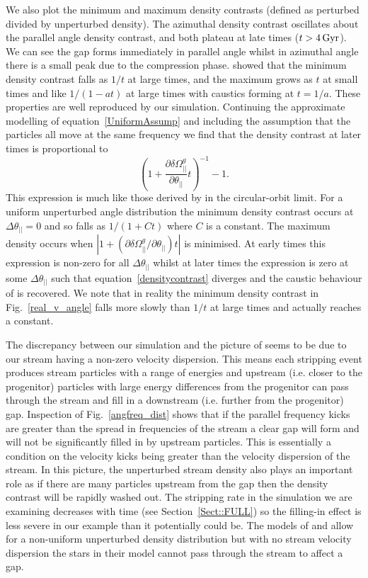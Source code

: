 \documentclass[useAMS,usenatbib,fleqn,a4paper]{mn2e}
\def\Gyr{\,{\rm Gyr}}
\begin{document}
We also plot the minimum and maximum density contrasts (defined as perturbed divided by unperturbed density). The azimuthal density contrast oscillates about the parallel angle density contrast, and both plateau at late times ($t>4\Gyr$). We can see the gap forms immediately in parallel angle whilst in azimuthal angle there is a small peak due to the compression phase. \cite{ErkalBelokurov2015} showed that the minimum density contrast falls as $1/t$ at large times, and the maximum grows as $t$ at small times and like $1/(1-at)$ at large times with caustics forming at $t=1/a$. These properties are well reproduced by our simulation. Continuing the approximate modelling of equation~\eqref{UniformAssump} and including the assumption that the particles all move at the same frequency we find that the density contrast at later times is proportional to
\begin{equation}
(1+\frac{\partial\delta\Omega^g_{||}}{\partial\theta_{||}}t)^{-1}-1.
\label{densitycontrast}
\end{equation}
This expression is much like those derived by \cite{ErkalBelokurov2015} in the circular-orbit limit. For a uniform unperturbed angle distribution the minimum density contrast occurs at $\Delta\theta_{||}=0$ and so falls as $1/(1+Ct)$ where $C$ is a constant. The maximum density occurs when $|1+(\partial\delta\Omega^g_{||}/\partial\theta_{||})t|$ is minimised. At early times this expression is non-zero for all $\Delta\theta_{||}$ whilst at later times the expression is zero at some $\Delta\theta_{||}$ such that equation~\eqref{densitycontrast} diverges and the caustic behaviour of \cite{ErkalBelokurov2015} is recovered. We note that in reality the minimum density contrast in Fig.~\ref{real_v_angle} falls more slowly than $1/t$ at large times and actually reaches a constant.

The discrepancy between our simulation and the picture of \cite{ErkalBelokurov2015} seems to be due to our stream having a non-zero velocity dispersion. This means each stripping event produces stream particles with a range of energies and upstream (i.e. closer to the progenitor) particles with large energy differences from the progenitor can pass through the stream and fill in a downstream (i.e. further from the progenitor) gap. Inspection of Fig.~\ref{angfreq_dist} shows that if the parallel frequency kicks are greater than the spread in frequencies of the stream a clear gap will form and will not be significantly filled in by upstream particles. This is essentially a condition on the velocity kicks being greater than the velocity dispersion of the stream. In this picture, the unperturbed stream density also plays an important role as if there are many particles upstream from the gap then the density contrast will be rapidly washed out. The stripping rate in the simulation we are examining decreases with time (see Section~\ref{Sect::FULL}) so the filling-in effect is less severe in our example than it potentially could be. The models of \cite{ErkalBelokurov2015} and \cite{ErkalBelokurov2015b} allow for a non-uniform unperturbed density distribution but with no stream velocity dispersion the stars in their model cannot pass through the stream to affect a gap.
\end{document}
